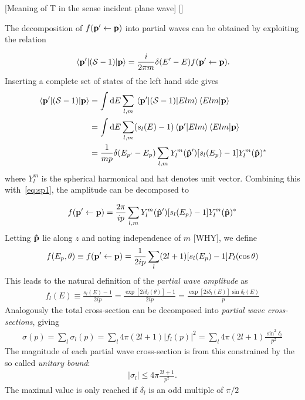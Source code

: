 [Meaning of T in the sense incident plane wave]
[]

The decomposition of \(f(\vb{p}^{\prime}\leftarrow\vb{p})\) into partial waves
can be obtained by exploiting the relation

\begin{equation}
  \label{eq:sp1}
  \mel{\vb{p}^{\prime}}{(\mathcal{S}-1)}{\vb{p}} = \frac{i}{2\pi m}\delta(E^{\prime}-E)f(\vb{p}^{\prime}\leftarrow \vb{p}).
\end{equation}
Inserting a complete set of states of the left hand side gives
\begin{align*}
  \mel{\vb{p}^{\prime}}{(\scat-1)}{\vb{p}} &= \int \dd E \sum_{l, m}  \mel{\vb{p}^{\prime}}{(\scat-1)}{Elm}\ip{Elm}{\vb{p}}\\
                                             &=  \int \dd E \sum_{l, m} (s_{l}(E)-1) \ip{\vb{p}^{\prime}}{Elm}\ip{Elm}{\vb{p}}\\
  &= \frac{1}{mp}\delta(E_{p^{\prime}}-E_{p})\sum_{l,m}Y_{l}^{m}(\vu{p}^{\prime})[s_{l}(E_{p})-1]Y^{m}_{l}(\vu{p})^{*}
\end{align*}
where \(Y_{l}^{m}\) is the spherical harmonical and hat denotes unit vector. Combining this
with~\eqref{eq:sp1}, the amplitude can be decomposed to

\begin{align*}
  f(\vb{p}^{\prime}\leftarrow\vb{p}) = \frac{2\pi}{ip}\sum_{l,m}Y_{l}^{m}(\vu{p}^{\prime})[s_{l}(E_{p})-1]Y^{m}_{l}(\vu{p})^{*}
\end{align*}
Letting \(\vu{p}\) lie along \(z\) and noting independence of \(m\) [WHY], we
define
\begin{align*}
  f(E_{p},\theta) \equiv f(\vb{p}^{\prime}\leftarrow\vb{p})=\frac{1}{2ip}\sum_{l}(2l+1)[s_{l}(E_{p})-1]P_{l}(\cos\theta)
\end{align*}
This leads to the natural definition of the \textit{partial wave amplitude} as
\begin{align*}
  f_{l}(E) \equiv \frac{s_{l}(E)-1}{2ip} = \frac{\exp[ 2i\delta_{l}(\theta)] - 1}{2ip} = \frac{\exp[2i\delta_{l}(E)]\sin\delta_{l}(E)}{p}
\end{align*}
Analogously the total cross-section can be decomposed into \textit{partial wave
  cross-sections}, giving
\begin{align*}
  \sigma(p) = \sum_{l}\sigma_{l}(p) = \sum_{l}4\pi(2l+1)\left| f_{l}(p) \right|^{2} = \sum_{l}4\pi(2l+1)\frac{\sin^{2}\delta_{l}}{p^{2}}
\end{align*}
The magnitude of each partial wave cross-section is from this constrained by the
so called \textit{unitary bound}: 
\begin{align*}
  |\sigma_{l}| \leq 4\pi\frac{2l+1}{p^{2}}.
\end{align*}
The maximal value is only reached if
\(\delta_{l}\) is an odd multiple of \(\pi/2\)

